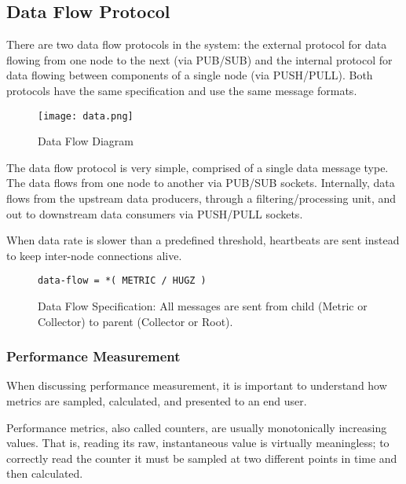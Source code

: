 \subsection{Data Flow Protocol}
\label{proto_data}

There are two data flow protocols in the \dcamp system: the external protocol for data flowing from one node to the next
(via PUB/SUB) and the internal protocol for data flowing between components of a single node (via PUSH/PULL). Both
protocols have the same specification and use the same message formats.

\begin{figure}[ht]
    \centering
    \texttt{[image: data.png]}
    \caption{Data Flow Diagram}
    \label{fig:proto_data_image}
\end{figure}

The \dcamp data flow protocol is very simple, comprised of a single data message type. The data flows from one node to
another via PUB/SUB sockets. Internally, data flows from the upstream data producers, through a filtering/processing
unit, and out to downstream data consumers via PUSH/PULL sockets.

When data rate is slower than a predefined threshold, heartbeats are sent instead to keep inter-node connections alive.

\begin{figure}[H]
\vspace{+10pt}
\begin{verbatim}
data-flow = *( METRIC / HUGZ )
\end{verbatim}
\vspace{-5pt}
\caption[Data Flow Specification]
	{Data Flow Specification: All messages are sent from child (Metric or Collector) to parent (Collector or Root).}
\label{fig:proto_data_spec}
\end{figure}

\subsubsection{Performance Measurement}

When discussing performance measurement, it is important to understand how metrics are sampled, calculated, and
presented to an end user.

Performance metrics, also called counters, are usually monotonically increasing values. That is, reading its raw,
instantaneous value is virtually meaningless; to correctly read the counter it must be sampled at two different points
in time and then calculated.

